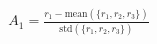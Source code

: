 \documentclass[preview]{standalone}
\begin{document}
\begin{align*}
A_1 = \frac{r_1 - \text{mean}\left(\{r_1, r_2, r_3\}\right)}{\text{std}\left(\{r_1, r_2, r_3\}\right)}
\end{align*}
\end{document}
